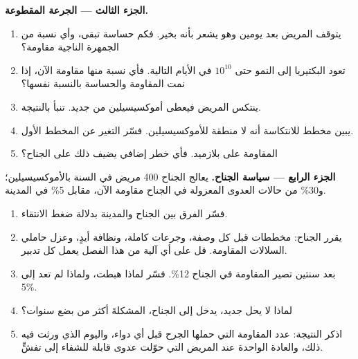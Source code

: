\begin{problem}
\medskip
\noindent\textbf{الجزء الثالث --- الجرعة المقطوعة.}
\begin{enumerate}[resume]
  \item يتوقف المريض بعد يومين وهو يشعر بأنه بخير. فكم  حساسة
        تبقى، وأي نسبة من الجمهرة الناجية مقاومة؟
  \item تعود البكتيريا إلى النمو حتى $10^{10}$ في الأيام التالية. فأي
        نسبة منها مقاومة الآن، إذا نمت  المقاومة والحساسة
        بالنسبة نفسها؟
  \item ينتكس المريض فيعطى أموكسيسيلين من جديد. تنبأ بالنتيجة.
  \item يبين مخطط  للانتكاسة أنه لا منطقة للأموكسيسيلين.
        فسّر التغير عن المخطط الأول.
  \item {} المقاومة على بلازميد. فأي خطر إضافي يضيف ذلك على
        الجناح؟
\end{enumerate}

\medskip
\noindent\textbf{الجزء الرابع --- سياسة الجناح.}
يعالج الجناح 400 مريض في السنة بالأموكسيسيلين؛ و30\% من حالات العدوى
المعزولة في الجناح مقاومة الآن، مقابل 5\% في المدينة.
\begin{enumerate}[resume]
  \item فسّر الفرق بين الجناح والمدينة بدلالة ضغط الانتقاء.
  \item يقرر الجناح: مخططات  قبل كل وصفة، وجرعات كاملة،
        ونظافة أيدٍ، وعزل حاملي السلالات المقاومة. قل على أي آلية من
        هذا الفصل يعمل كل تدبير.
  \item بعد سنتين تصير المقاومة في الجناح 12\%. فسّر لماذا هبطت،
        ولماذا لم تعد إلى 5\%.
  \item لماذا لا يحل  جديد، يدخل إلى الجناح، المشكلةَ أكثر
        من بضع سنوات؟
  \item اذكر النتيجة: عدد  المقاومة التي حملها الجرح قبل أي
        دواء، واليوم الذي ورثت فيه ذلك، والعادة الواحدة عند المريض
        التي حوّلت عدوى قابلة للشفاء إلى تفشٍّ.
\end{enumerate}
\end{problem}
